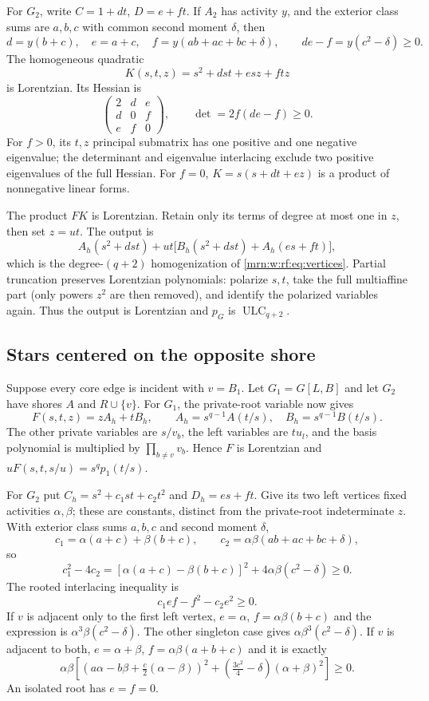 \documentclass[11pt,a4paper]{article}
\theoremstyle{remark}\newtheorem{remark}[theorem]{Remark}
\newcommand{\ULC}{\operatorname{ULC}}      %
\newcommand{\e}{\mathrm e}                 %
\begin{document}
For $G_2$, write $C=1+dt$, $D=e+ft$. If $A_2$ has activity $y$, and the exterior class sums are $a,b,c$ with common second moment $\delta$, then
\[
 d=y(b+c),\quad e=a+c,\quad f=y(ab+ac+bc+\delta),
 \qquad de-f=y(c^2-\delta)\ge0.
\]
The homogeneous quadratic
\[
 K(s,t,z)=s^2+dst+esz+ftz
\]
is Lorentzian. Its Hessian is
\[
 \begin{pmatrix}2&d&e\\d&0&f\\e&f&0\end{pmatrix},
 \qquad \det=2f(de-f)\ge0.
\]
For $f>0$, its $t,z$ principal submatrix has one positive and one negative eigenvalue; the determinant and eigenvalue interlacing exclude two positive eigenvalues of the full Hessian. For $f=0$, $K=s(s+dt+ez)$ is a product of nonnegative linear forms.

The product $FK$ is Lorentzian. Retain only its terms of degree at most one in $z$, then set $z=ut$. The output is
\[
 A_h(s^2+dst)+ut\big[B_h(s^2+dst)+A_h(es+ft)\big],
\]
which is the degree-$(q+2)$ homogenization of \eqref{mrn:w:rf:eq:vertices}. Partial truncation preserves Lorentzian polynomials: polarize $s,t$, take the full multiaffine part (only powers $z^2$ are then removed), and identify the polarized variables again. Thus the output is Lorentzian and $p_G$ is $\ULC_{q+2}$.

\subsection{Stars centered on the opposite shore}
Suppose every core edge is incident with $v=B_1$. Let $G_1=G[L,B]$ and let $G_2$ have shores $A$ and $R\cup\{v\}$. For $G_1$, the private-root variable now gives
\[
 F(s,t,z)=zA_h+tB_h,
 \qquad A_h=s^{q-1}A(t/s),\quad B_h=s^{q-1}B(t/s).
\]
The other private variables are $s/v_b$, the left variables are $tu_l$, and the basis polynomial is multiplied by $\prod_{b\ne v}v_b$. Hence $F$ is Lorentzian and $uF(s,t,s/u)=s^qp_1(t/s)$.

For $G_2$ put $C_h=s^2+c_1st+c_2t^2$ and $D_h=es+ft$. Give its two left vertices fixed activities $\alpha,\beta$; these are constants, distinct from the private-root indeterminate $z$. With exterior class sums $a,b,c$ and second moment $\delta$,
\[
 c_1=\alpha(a+c)+\beta(b+c),\qquad c_2=\alpha\beta(ab+ac+bc+\delta),
\]
so
\[
 c_1^2-4c_2=[\alpha(a+c)-\beta(b+c)]^2+4\alpha\beta(c^2-\delta)\ge0.
\]
The rooted interlacing inequality is
\begin{equation}\label{mrn:w:rf:eq:rootinterlace}
 c_1ef-f^2-c_2e^2\ge0.
\end{equation}
If $v$ is adjacent only to the first left vertex, $e=\alpha$, $f=\alpha\beta(b+c)$ and the expression is $\alpha^3\beta(c^2-\delta)$. The other singleton case gives $\alpha\beta^3(c^2-\delta)$. If $v$ is adjacent to both, $e=\alpha+\beta$, $f=\alpha\beta(a+b+c)$ and it is exactly
\[
 \alpha\beta\left[
 \left(a\alpha-b\beta+\tfrac c2(\alpha-\beta)\right)^2
 +\left(\tfrac{3c^2}{4}-\delta\right)(\alpha+\beta)^2\right]\ge0.
\]
An isolated root has $e=f=0$.
\end{document}
